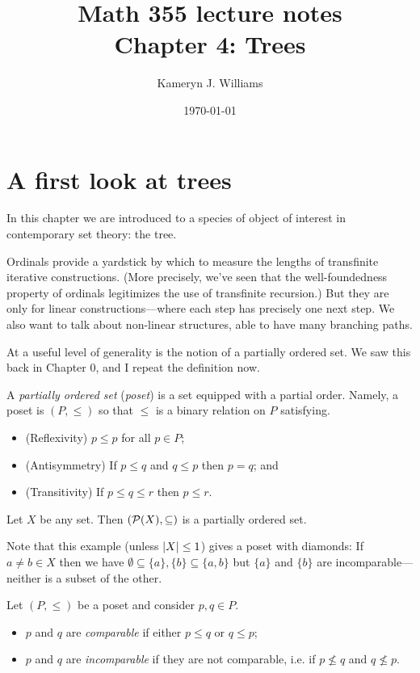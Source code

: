 \documentclass[10pt]{amsart}
\title{Math 355 lecture notes \\ Chapter 4: Trees}
\author{Kameryn J. Williams}
\date{\today}
\begin{document}
\maketitle

\section{A first look at trees}

In this chapter we are introduced to a species of object of interest in contemporary set theory: the tree.

Ordinals provide a yardstick by which to measure the lengths of transfinite iterative constructions. (More precisely, we've seen that the well-foundedness property of ordinals legitimizes the use of transfinite recursion.) But they are only for linear constructions---where each step has precisely one next step. We also want to talk about non-linear structures, able to have many branching paths.

At a useful level of generality is the notion of a partially ordered set. We saw this back in Chapter 0, and I repeat the definition now.

\begin{definition}
A \emph{partially ordered set} (\emph{poset}) is a set equipped with a partial order. Namely, a poset is $(P,\le)$ so that $\le$ is a binary relation on $P$ satisfying.
\begin{itemize}
\item (Reflexivity) $p \le p$ for all $p \in P$;
\item (Antisymmetry) If $p \le q$ and $q \le p$ then $p = q$; and
\item (Transitivity) If $p \le q \le r$ then $p \le r$.
\end{itemize}
\end{definition}

\begin{example}
Let $X$ be any set. Then $(\mathcal{P}(X), \subseteq)$ is a partially ordered set.
\end{example}

Note that this example (unless $\left\lvert X \right\rvert \le 1$) gives a poset with diamonds: If $a \ne b \in X$ then we have $\emptyset \subseteq \{a\}, \{b\} \subseteq \{a,b\}$ but $\{a\}$ and $\{b\}$ are incomparable---neither is a subset of the other. 

\begin{definition}
Let $(P,\le)$ be a poset and consider $p,q \in P$.
\begin{itemize}
\item $p$ and $q$ are \emph{comparable} if either $p \le q$ or $q \le p$;
\item $p$ and $q$ are \emph{incomparable} if they are not comparable, i.e. if $p \not \le q$ and $q \not \le p$.
\end{itemize}
\end{definition}
\end{document}
